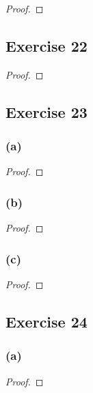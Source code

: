 \documentclass[14pt]{extarticle}
\begin{document}
\begin{proof}

\end{proof}

\subsection{Exercise 22}

\begin{proof}

\end{proof}

\subsection{Exercise 23}

\subsubsection{(a)}

\begin{proof}

\end{proof}

\subsubsection{(b)}

\begin{proof}

\end{proof}

\subsubsection{(c)}

\begin{proof}

\end{proof}

\subsection{Exercise 24}

\subsubsection{(a)}

\begin{proof}

\end{proof}
\end{document}
